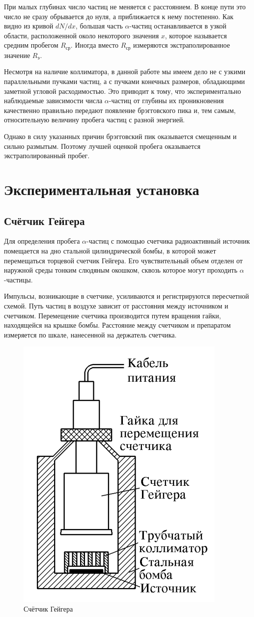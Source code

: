     При малых глубинах число частиц не меняется с расстоянием. В конце пути это число не сразу обрывается до нуля, а приближается к нему постепенно. Как видно из кривой $dN/dx$, большая часть $\alpha$-частиц останавливается в узкой области, расположенной около некоторого значения $x$, которое называется средним пробегом $R_{\text{ср}}$. Иногда вместо $R_{\text{ср}}$ измеряются экстраполированное значение $R_{\text{э}}$.

    Несмотря на наличие коллиматора, в данной работе мы имеем дело не с узкими параллельными пучками частиц, а с пучками конечных размеров, обладающими заметной угловой расходимостью. Это приводит к тому, что экспериментально наблюдаемые зависимости числа $\alpha$-частиц от глубины их проникновения качественно правильно передают появление брэгговского пика и, тем самым, относительную величину пробега частиц с разной энергией. 
    
    Однако в силу указанных причин брэгговский пик оказывается смещенным и сильно размытым.
    Поэтому лучшей оценкой пробега оказывается экстраполированный пробег.

\section{Экспериментальная установка}
\subsection{Счётчик Гейгера}

    Для определения пробега $\alpha$-частиц с помощью счетчика радиоактивный источник помещается на дно стальной цилиндрической бомбы, в которой может перемещаться торцевой счетчик Гейгера. Его чувствительный объем отделен от наружной среды тонким слюдяным
    окошком, сквозь которое могут проходить $\alpha$-частицы.


    Импульсы, возникающие в счетчике, усиливаются и регистрируются пересчетной схемой. Путь частиц в воздухе зависит от расстояния
    между источником и счетчиком. Перемещение счетчика производится путем вращения гайки, находящейся на крышке бомбы. Расстояние
    между счетчиком и препаратом измеряется по шкале, нанесенной на держатель счетчика.

    \begin{figure}[h!]
        \centering
        \includegraphics[width = 6 cm]{images/geiger}
        \caption{Счётчик Гейгера}
        \label{}
    \end{figure}

